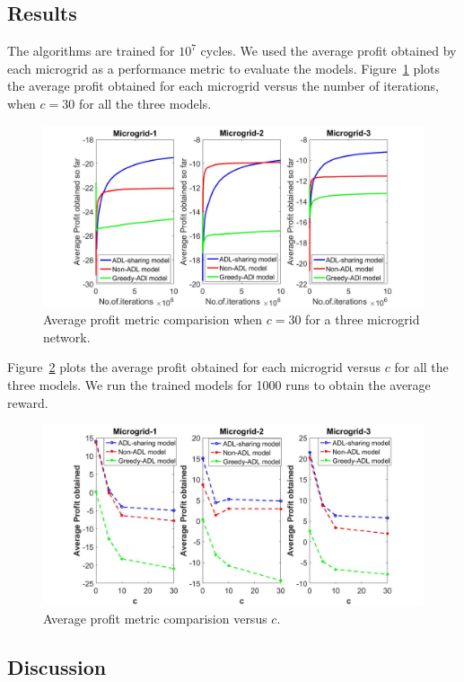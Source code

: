 \subsection{Results}
The algorithms are trained for $10^7$ cycles. We used the average profit obtained by each microgrid as a performance metric to evaluate the models. Figure~\ref{r2} plots the average profit obtained for each microgrid versus the number of iterations, when $c = 30$ for all the three models. 
\begin{figure}[thbp]
	\centering
	\includegraphics[scale = 0.2]{second_plot.jpg}
	\caption{Average profit metric comparision when $c = 30$ for a three microgrid network.}
        \label{r2}
\end{figure}

Figure~\ref{r1} plots the average profit obtained for each microgrid versus $c$ for all the three models. We run the trained models for 1000 runs to obtain the average reward. 
\begin{figure}[thbp]
	\centering
	\includegraphics[scale = 0.2]{first_plot.jpg}
	\caption{Average profit metric comparision versus $c$.}
	 \label{r1}
\end{figure}
\subsection{Discussion}

